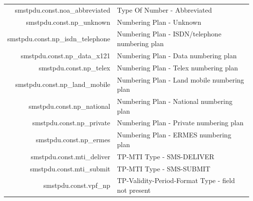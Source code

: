 \documentclass[a4paper,latin]{paper}
\begin{document}
\begin{tabularx}{\linewidth}{ | >{\ttfamily} r | >{\ttfamily} X |}
	smstpdu.const.noa\_abbreviated			& Type Of Number - Abbreviated\\
	smstpdu.const.np\_unknown			& Numbering Plan - Unknown\\
	smstpdu.const.np\_isdn\_telephone		& Numbering Plan - ISDN/telephone numbering plan\\
	smstpdu.const.np\_data\_x121			& Numbering Plan - Data numbering plan\\
	smstpdu.const.np\_telex				& Numbering Plan - Telex numbering plan\\
	smstpdu.const.np\_land\_mobile			& Numbering Plan - Land mobile numbering plan\\
	smstpdu.const.np\_national			& Numbering Plan - National numbering plan\\
	smstpdu.const.np\_private			& Numbering Plan - Private numbering plan\\
	smstpdu.const.np\_ermes				& Numbering Plan - ERMES numbering plan\\
	smstpdu.const.mti\_deliver			& TP-MTI Type - SMS-DELIVER\\
	smstpdu.const.mti\_submit			& TP-MTI Type - SMS-SUBMIT\\
	smstpdu.const.vpf\_np				& TP-Validity-Period-Format Type - field not present\\
	\hline
\end{tabularx}%
\clearpage
\end{document}

